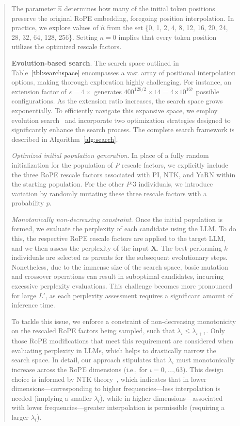 \begin{abstract}
The parameter $\hat{n}$ determines how many of the initial token positions preserve the original RoPE embedding, foregoing position interpolation. In practice, we explore values of $\hat{n}$ from the set \{0, 1, 2, 4, 8, 12, 16, 20, 24, 28, 32, 64, 128, 256\}. Setting $\hat{n}=0$ implies that every token position utilizes the optimized rescale factors.

\textbf{Evolution-based search}. The search space outlined in Table~\ref{tbl:searchspace} encompasses a vast array of positional interpolation options, making thorough exploration highly challenging. For instance, an extension factor of $s=4\times$ generates $400^{128/2}\times14$ = 4$\times10^{167}$ possible configurations. As the extension ratio increases, the search space grows exponentially. To efficiently navigate this expansive space, we employ evolution search~\cite{guo2020single} and incorporate two optimization strategies designed to significantly enhance the search process. The complete search framework is described in Algorithm~\ref{alg:search}.

\textit{Optimized initial population generation}. In place of a fully random initialization for the population of $P$ rescale factors, we explicitly include the three RoPE rescale factors associated with PI, NTK, and YaRN within the starting population. For the other $P$-3 individuals, we introduce variation by randomly mutating these three rescale factors with a probability $p$.

\textit{Monotonically non-decreasing constraint}. Once the initial population is formed, we evaluate the perplexity of each candidate using the LLM. To do this, the respective RoPE rescale factors are applied to the target LLM, and we then assess the perplexity of the input $\mathbf{X}$. The best-performing $k$ individuals are selected as parents for the subsequent evolutionary steps. Nonetheless, due to the immense size of the search space, basic mutation and crossover operations can result in suboptimal candidates, incurring excessive perplexity evaluations. This challenge becomes more pronounced for large $L'$, as each perplexity assessment requires a significant amount of inference time.

To tackle this issue, we enforce a constraint of non-decreasing monotonicity on the rescaled RoPE factors being sampled, such that $\lambda_i \le \lambda_{i+1}$. Only those RoPE modifications that meet this requirement are considered when evaluating perplexity in LLMs, which helps to drastically narrow the search space. In detail, our approach stipulates that $\lambda_i$ must monotonically increase across the RoPE dimensions (i.e., for $i=0,\ldots,63$). This design choice is informed by NTK theory~\cite{jacot2018neural,tancik2020fourier,ntk}, which indicates that in lower dimensions—corresponding to higher frequencies—less interpolation is needed (implying a smaller $\lambda_i$), while in higher dimensions—associated with lower frequencies—greater interpolation is permissible (requiring a larger $\lambda_i$).


\end{abstract}
